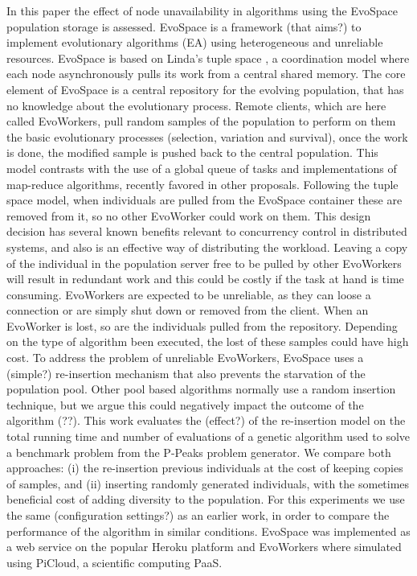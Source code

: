 \documentclass{llncs}
\begin{document}
In this paper the effect of node unavailability in algorithms using the 
EvoSpace population storage is assessed. EvoSpace \cite{Evospace,FreeLunch} is
a framework (that aims?) to implement evolutionary algorithms (EA) using 
heterogeneous and unreliable resources. EvoSpace is based on Linda's tuple
space \cite{Evospace}, a coordination model where each node asynchronously
pulls its work from a central shared memory. The core element of EvoSpace is a
central repository for the evolving population, that has no knowledge about
the evolutionary process. Remote clients, which are here called EvoWorkers,
pull random samples of the population to perform on them the basic evolutionary
processes (selection, variation and survival), once the work is done, the
modified sample is pushed back to the central population.
This model contrasts with  the use of a global queue of tasks and
implementations of map-reduce algorithms, recently favored in other proposals.
Following the tuple space model, when individuals are pulled from the EvoSpace
container these are removed from it, so no other EvoWorker could work on them.
This design decision has several known benefits relevant to concurrency control 
in distributed systems, and also is an effective way of distributing the
workload. Leaving a copy of the individual in the population server free to
be pulled by other EvoWorkers will result in redundant work and this could be
costly if the task at hand is time consuming. EvoWorkers are expected to be 
unreliable, as they can loose a connection or are simply shut down or removed 
from the client. When an EvoWorker is lost, so are the individuals pulled from
the repository. Depending on the type of algorithm been executed, the lost of
these samples could have high cost. To address the problem of unreliable 
EvoWorkers, EvoSpace uses a (simple?) re-insertion mechanism that also 
prevents the starvation of the population pool. Other pool based algorithms
normally use a random insertion technique, but we argue this could negatively 
impact the outcome of the algorithm (??). This work evaluates the (effect?) 
of the re-insertion model on the total running time and number of evaluations 
of a genetic algorithm used to solve a benchmark problem from the P-Peaks 
problem generator. We compare both approaches: (i) the re-insertion previous
individuals at the cost of keeping copies of samples, and (ii) inserting  
randomly generated individuals, with the sometimes beneficial cost of 
adding diversity to the population. For this experiments we use the same
(configuration settings?) as an earlier work, in order to compare the 
performance of the algorithm in similar conditions.
EvoSpace was implemented as a web service on the popular Heroku platform 
and EvoWorkers where simulated using PiCloud, a scientific computing PaaS. 
\end{document}
